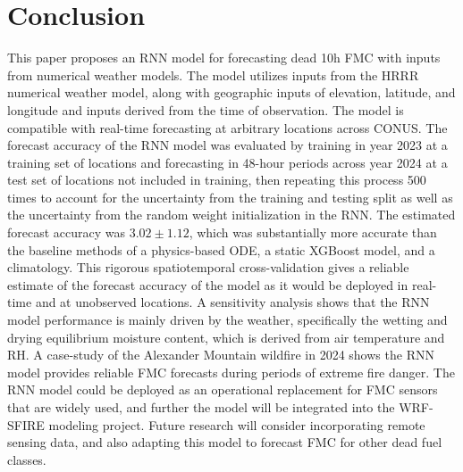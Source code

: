\documentclass[fire,article,submit,pdftex,moreauthors]{Definitions/mdpi}
\begin{document}
\section{Conclusion}
This paper proposes an RNN model for forecasting dead 10h FMC with inputs from numerical weather models. The model utilizes inputs from the HRRR numerical weather model, along with geographic inputs of elevation, latitude, and longitude and inputs derived from the time of observation. The model is compatible with real-time forecasting at arbitrary locations across CONUS. The forecast accuracy of the RNN model was evaluated by training in year 2023 at a training set of locations and forecasting in 48-hour periods across year 2024 at a test set of locations not included in training, then repeating this process 500 times to account for the uncertainty from the training and testing split as well as the uncertainty from the random weight initialization in the RNN. The estimated forecast accuracy was $3.02\pm 1.12$, which was substantially more accurate than the baseline methods of a physics-based ODE, a static XGBoost model, and a climatology. This rigorous spatiotemporal cross-validation gives a reliable estimate of the forecast accuracy of the model as it would be deployed in real-time and at unobserved locations. A sensitivity analysis shows that the RNN model performance is mainly driven by the weather, specifically the wetting and drying equilibrium moisture content, which is derived from air temperature and RH. A case-study of the Alexander Mountain wildfire in 2024 shows the RNN model provides reliable FMC forecasts during periods of extreme fire danger. The RNN model could be deployed as an operational replacement for FMC sensors that are widely used, and further the model will be integrated into the WRF-SFIRE modeling project. Future research will consider incorporating remote sensing data, and also adapting this model to forecast FMC for other dead fuel classes.
\vspace{6pt} 


\end{document}
